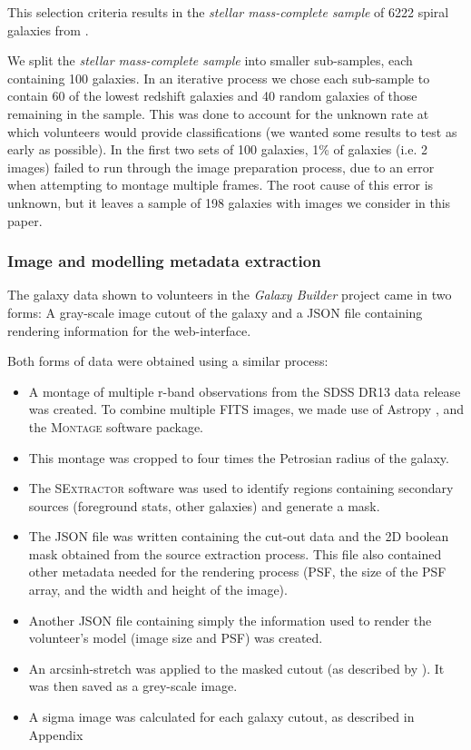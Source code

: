 \documentclass[../main.tex]{subfiles}
\begin{document}
This selection criteria results in the \textit{stellar mass-complete sample} of 6222 spiral galaxies from \citet{2017MNRAS.472.2263H}.

We split the \textit{stellar mass-complete sample} into smaller sub-samples, each containing 100 galaxies. In an iterative process we chose each sub-sample to contain 60 of the lowest redshift galaxies and 40 random galaxies of those remaining in the sample. This was done to account for the unknown rate at which volunteers would provide classifications (we wanted some results to test as early as possible). In the first two sets of 100 galaxies, 1\% of galaxies (i.e. 2 images) failed to run through the image preparation process, due to an error when attempting to montage multiple frames. The root cause of this error is unknown, but it leaves a sample of 198 galaxies with images we consider in this paper.

\subsubsection{Image and modelling metadata extraction}

The galaxy data shown to volunteers in the \textit{Galaxy Builder} project came in two forms: A gray-scale image cutout of the galaxy and a JSON file containing rendering information for the web-interface.

Both forms of data were obtained using a similar process:

\begin{itemize}
\item A montage of multiple r-band observations from the SDSS DR13 \citep{2017ApJS..233...25A} data release was created. To combine multiple FITS images, we made use of Astropy \citep{2018AJ....156..123T}, and the \textsc{Montage} \citep{2010arXiv1005.4454J} software package.
\item This montage was cropped to four times the Petrosian radius of the galaxy.
\item The \textsc{SExtractor} software \citep{source-extractor} was used to identify regions containing secondary sources (foreground stats, other galaxies) and generate a mask.
\item The JSON file was written containing the cut-out data and the 2D boolean mask obtained from the source extraction process. This file also contained other metadata needed for the rendering process (PSF, the size of the PSF array, and the width and height of the image).
\item Another JSON file containing simply the information used to render the volunteer's model (image size and PSF) was created.
\item An arcsinh-stretch was applied to the masked cutout (as described by \citealt{Lupton2003:astro-ph/0312483v1}). It was then saved as a grey-scale image.
\item A sigma image was calculated for each galaxy cutout, as described in Appendix 
\end{itemize}
\end{document}
